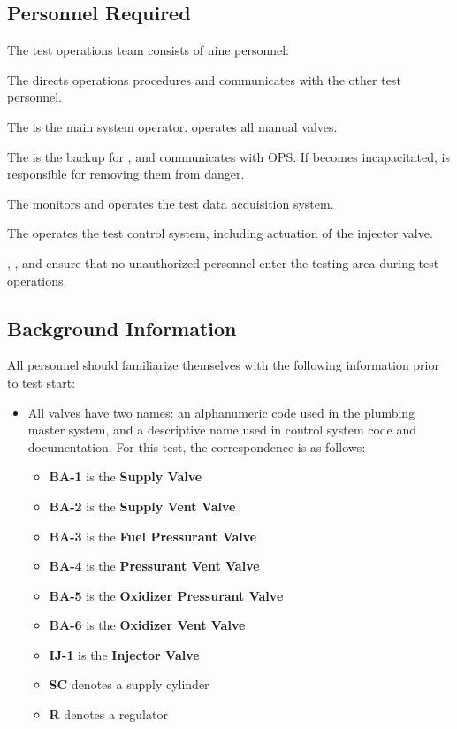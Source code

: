 \subsection{Personnel Required}
The test operations team consists of nine personnel:
\begin{checklist}
    \item The \opsfull{} directs operations procedures and communicates with the other test personnel.
    \item The \primaryfull{} is the main system operator. \primary{} operates all manual valves. 
    \item The \secondaryfull{} is the backup for \primary{}, and communicates with OPS. If \primary{} becomes incapacitated, \secondary{} is responsible for removing them from danger.
    \item The \daqfull{} monitors and operates the test data acquisition system.
    \item The \controlfull{} operates the test control system, including actuation of the injector valve. 
    \item \perifull{}, \periifull{}, and \periiifull{} ensure that no unauthorized personnel enter the testing area during test operations.
\end{checklist}
\setcounter{checklistnum}{0}

\subsection{Background Information}
All personnel should familiarize themselves with the following information prior to test start:
\begin{itemize}
    \item All valves have two names: an alphanumeric code used in the plumbing master system, and a descriptive name used in control system code and documentation. For this test, the correspondence is as follows:
    \begin{itemize}
    	\item \textbf{BA-1} is the \textbf{Supply Valve}
	    \item \textbf{BA-2} is the \textbf{Supply Vent Valve}
	    \item \textbf{BA-3} is the \textbf{Fuel Pressurant Valve}
	    \item \textbf{BA-4} is the \textbf{Pressurant Vent Valve}
	    \item \textbf{BA-5} is the \textbf{Oxidizer Pressurant Valve}
	    \item \textbf{BA-6} is the \textbf{Oxidizer Vent Valve}
	    \item \textbf{IJ-1} is the \textbf{Injector Valve}
	    \item \textbf{SC} denotes a supply cylinder
	    \item \textbf{R} denotes a regulator
	\end{itemize}
\end{itemize}

